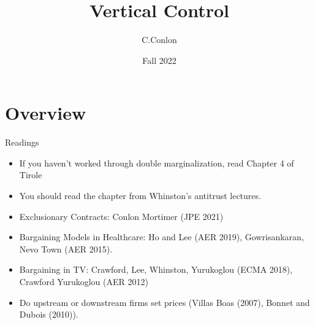 

\title []{Vertical Control}
\author{C.Conlon }
\date{Fall 2022}


\begin{frame}
\titlepage
\end{frame}




\section{Overview}


\begin{frame}{Readings}
\begin{itemize}
\item If you haven't worked through double marginalization, read Chapter 4 of Tirole
\item You should read the chapter from Whinston's antitrust lectures.
\item Exclusionary Contracts: Conlon Mortimer (JPE 2021)
\item Bargaining Models in Healthcare: Ho and Lee (AER 2019), Gowrisankaran, Nevo Town (AER 2015).
\item Bargaining in TV: Crawford, Lee, Whinston, Yurukoglou (ECMA 2018), Crawford Yurukoglou (AER 2012)
\item Do upstream or downstream firms set prices (Villas Boas (2007), Bonnet and Dubois (2010)).
\end{itemize}
\end{frame}


